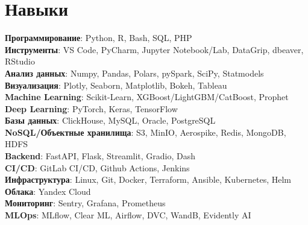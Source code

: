 \section{Навыки}
 \begin{itemize}[leftmargin=0.15in, label={}]
    {\item{
     \textbf{Программирование}{: Python, R, Bash, SQL, PHP} \\
     \textbf{Инструменты}{: VS Code, PyCharm, Jupyter Notebook/Lab, DataGrip, dbeaver, RStudio} \\
     \textbf{Анализ данных}{: Numpy, Pandas, Polars, pySpark, SciPy, Statmodels} \\
     \textbf{Визуализация}{: Plotly, Seaborn, Matplotlib, Bokeh, Tableau} \\
     \textbf{Machine Learning}{: Scikit-Learn, XGBoost/LightGBM/CatBoost, Prophet} \\
     \textbf{Deep Learning}{: PyTorch, Keras, TensorFlow} \\
     \textbf{Базы данных}{: ClickHouse, MySQL, Oracle, PostgreSQL} \\
     \textbf{NoSQL/Объектные хранилища}{: S3, MinIO, Aerospike, Redis, MongoDB, HDFS} \\
     \textbf{Backend}{: FastAPI, Flask, Streamlit, Gradio, Dash} \\
     \textbf{CI/CD}{: GitLab CI/CD, Github Actions, Jenkins} \\
     \textbf{Инфраструктура}{: Linux, Git, Docker, Terraform, Ansible, Kubernetes, Helm} \\
     \textbf{Облака}{: Yandex Cloud} \\
     \textbf{Мониторинг}{: Sentry, Grafana, Prometheus} \\
     \textbf{MLOps}{: MLflow, Clear ML, Airflow, DVC, WandB, Evidently AI} \\
    }}
 \end{itemize}